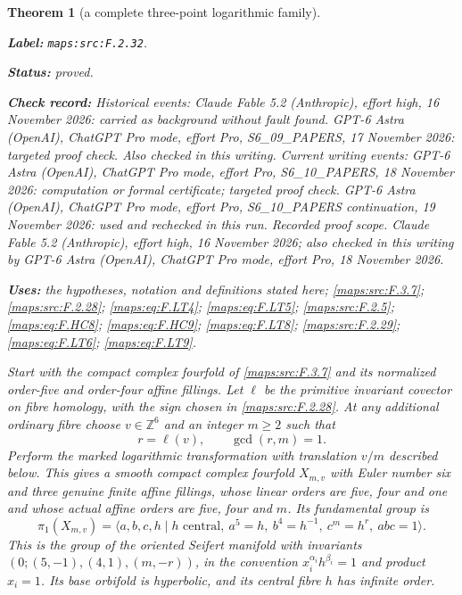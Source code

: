 \documentclass[11pt,a4paper]{article}
\newtheorem{theorem}{Theorem}[section]
\theoremstyle{definition}
\newcommand{\StatementRecord}[4]{\par\smallskip\begingroup\upshape\raggedright\noindent\textbf{Label:} \nolinkurl{#1}.\par\noindent\textbf{Status:} #2.\par\noindent\textbf{Check record:} #3.\par\noindent\textbf{Uses:} #4.\par\endgroup\smallskip}
\begin{document}
\begin{theorem}[a complete three-point logarithmic family]\label{maps:src:F.2.32}
\StatementRecord{maps:src:F.2.32}{proved}{Historical events: Claude Fable 5.2 (Anthropic), effort high, 16 November 2026: carried as background without fault found. GPT-6 Astra (OpenAI), ChatGPT Pro mode, effort Pro, S6\_09\_PAPERS, 17 November 2026: targeted proof check. Also checked in this writing. Current writing events: GPT-6 Astra (OpenAI), ChatGPT Pro mode, effort Pro, S6\_10\_PAPERS, 18 November 2026: computation or formal certificate; targeted proof check. GPT-6 Astra (OpenAI), ChatGPT Pro mode, effort Pro, S6\_10\_PAPERS continuation, 19 November 2026: used and rechecked in this run. \emph{Recorded proof scope.} Claude Fable 5.2 (Anthropic), effort high, 16 November 2026; also checked in this writing by GPT-6 Astra (OpenAI), ChatGPT Pro mode, effort Pro, 18 November 2026}{the hypotheses, notation and definitions stated here; \cref{maps:src:F.3.7}; \cref{maps:src:F.2.28}; \cref{maps:eq:F.LT4}; \cref{maps:eq:F.LT5}; \cref{maps:src:F.2.5}; \cref{maps:eq:F.HC8}; \cref{maps:eq:F.HC9}; \cref{maps:eq:F.LT8}; \cref{maps:src:F.2.29}; \cref{maps:eq:F.LT6}; \cref{maps:eq:F.LT9}}


Start with the compact complex fourfold of \ref{maps:src:F.3.7} and its
normalized order-five and order-four affine fillings.
Let $\ell$ be the primitive invariant covector on fibre
homology, with the sign chosen in \ref{maps:src:F.2.28}.
At any additional ordinary fibre choose
$v\in\mathbb Z^6$ and an integer $m\ge2$ such that
\[
 r=\ell(v),\qquad \gcd(r,m)=1.
\tag{F.LT1}\label{maps:eq:F.LT1}
\]
Perform the marked logarithmic transformation with
translation $v/m$ described below.
This gives a smooth compact complex fourfold $X_{m,v}$
with Euler number six and three genuine finite affine
fillings, whose linear orders are five, four and one
and whose actual affine orders are five, four and $m$.
Its fundamental group is
\[
 \pi_1(X_{m,v})=
 \langle a,b,c,h\mid h\text{ central},\
   a^5=h,\ b^4=h^{-1},\ c^m=h^r,\ abc=1\rangle .
\tag{F.LT2}\label{maps:eq:F.LT2}
\]
This is the group of the oriented Seifert manifold
with invariants
$(0;(5,-1),(4,1),(m,-r))$, in the convention
$x_i^{\alpha_i}h^{\beta_i}=1$ and product $x_i=1$.
Its base orbifold is hyperbolic, and its central fibre
$h$ has infinite order.


\end{theorem}
\end{document}
